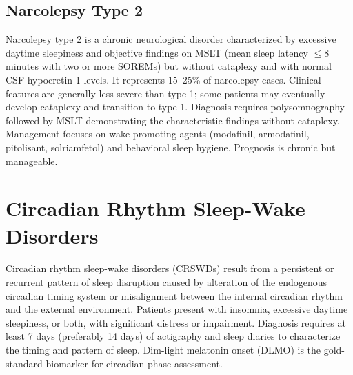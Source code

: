 \subsection{Narcolepsy Type 2}
\label{sec:Narcolepsy Type 2}
Narcolepsy type 2 is a chronic neurological disorder characterized by excessive daytime sleepiness and objective findings on MSLT (mean sleep latency $\le$8 minutes with two or more SOREMs) but without cataplexy and with normal CSF hypocretin-1 levels. It represents 15--25\% of narcolepsy cases. Clinical features are generally less severe than type 1; some patients may eventually develop cataplexy and transition to type 1. Diagnosis requires polysomnography followed by MSLT demonstrating the characteristic findings without cataplexy. Management focuses on wake-promoting agents (modafinil, armodafinil, pitolisant, solriamfetol) and behavioral sleep hygiene. Prognosis is chronic but manageable.

\section{Circadian Rhythm Sleep-Wake Disorders}








\label{sec:Circadian Rhythm Sleep-Wake Disorders}

Circadian rhythm sleep-wake disorders (CRSWDs) result from a persistent or recurrent pattern of sleep disruption caused by alteration of the endogenous circadian timing system or misalignment between the internal circadian rhythm and the external environment. Patients present with insomnia, excessive daytime sleepiness, or both, with significant distress or impairment. Diagnosis requires at least 7 days (preferably 14 days) of actigraphy and sleep diaries to characterize the timing and pattern of sleep. Dim-light melatonin onset (DLMO) is the gold-standard biomarker for circadian phase assessment.

